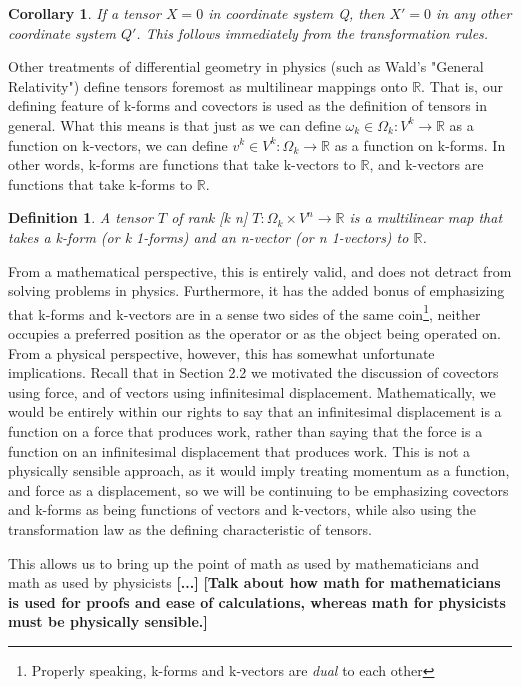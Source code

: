 \documentclass{book}
\newtheorem{defn}[equation]{Definition}
\newtheorem{coro}[equation]{Corollary}
\begin{document}
\begin{coro}
	If a tensor $X = 0$ in coordinate system Q, then $X' = 0$ in any other coordinate system $Q'$. This follows immediately from the transformation rules. 
\end{coro}

Other treatments of differential geometry in physics (such as Wald's "General Relativity") define tensors foremost as multilinear mappings onto $\mathbb{R}$. That is, our defining feature of k-forms and covectors is used as the definition of tensors in general. What this means is that just as we can define $\omega_k \in \Omega_k : V^k \to \mathbb{R}$ as a function on k-vectors, we can define $v^k \in V^k : \Omega_k \to \mathbb{R}$ as a function on k-forms. In other words, k-forms are functions that take k-vectors to $\mathbb{R}$, and k-vectors are functions that take k-forms to $\mathbb{R}$. 

\begin{defn}
	A tensor $T$ of rank [k n] $T: \Omega_k \times V^n \to \mathbb{R}$ is a multilinear map that takes a k-form (or k 1-forms) and an n-vector (or n 1-vectors) to $\mathbb{R}$. 
\end{defn}

From a mathematical perspective, this is entirely valid, and does not detract from solving problems in physics. Furthermore, it has the added bonus of emphasizing that k-forms and k-vectors are in a sense two sides of the same coin\footnote{Properly speaking, k-forms and k-vectors are \emph{dual} to each other}, neither occupies a preferred position as the operator or as the object being operated on. From a physical perspective, however, this has somewhat unfortunate implications. Recall that in Section 2.2 we motivated the discussion of covectors using force, and of vectors using infinitesimal displacement. Mathematically, we would be entirely within our rights to say that an infinitesimal displacement is a function on a force that produces work, rather than saying that the force is a function on an infinitesimal displacement that produces work. This is not a physically sensible approach, as it would imply treating momentum as a function, and force as a displacement, so we will be continuing to be emphasizing covectors and k-forms as being functions of vectors and k-vectors, while also using the transformation law as the defining characteristic of tensors.

This allows us to bring up the point of math as used by mathematicians and math as used by physicists \textbf{[...]}
\textbf{[Talk about how math for mathematicians is used for proofs and ease of calculations, whereas math for physicists must be physically sensible.]}
\end{document}
